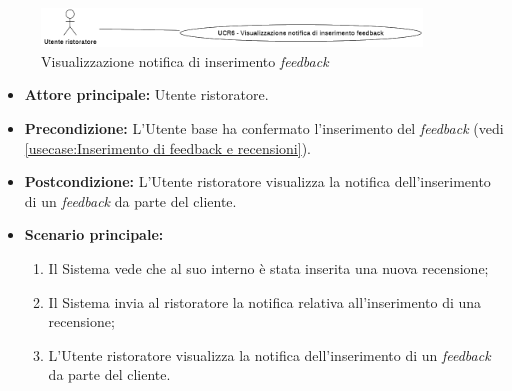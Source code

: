 \newpage
{}
\label{usecase:Visualizzazione notifica di inserimento feedback}

\begin{figure}[h]
	\centering
	\includegraphics[width=0.9\textwidth]{./uml/UCR6.png} 
	\caption{Visualizzazione notifica di inserimento \textit{feedback}}
	\label{fig:UCR6}
  \end{figure}

\begin{itemize}
	\item \textbf{Attore principale:} Utente ristoratore.

	\item \textbf{Precondizione:} L'Utente base ha confermato l'inserimento del \textit{feedback} (vedi \autoref{usecase:Inserimento di feedback e recensioni}).

	\item \textbf{Postcondizione:} L'Utente ristoratore visualizza la notifica dell'inserimento di un \textit{feedback} da parte del cliente.

	\item \textbf{Scenario principale:}
	      \begin{enumerate}
		      \item Il Sistema vede che al suo interno è stata inserita una nuova recensione;
		      \item Il Sistema invia al ristoratore la notifica relativa all'inserimento di una recensione;
		      \item L'Utente ristoratore visualizza la notifica dell'inserimento di un \textit{feedback} da parte del cliente.
	      \end{enumerate}
\end{itemize}
